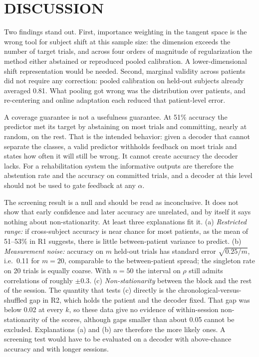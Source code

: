 \documentclass[letterpaper, 10pt, conference]{ieeeconf}
\begin{document}
\section{DISCUSSION}
Two findings stand out. First, importance weighting in
the tangent space is the wrong tool for subject shift at this sample size: the
dimension exceeds the number of target trials, and across four orders of
magnitude of regularization the method either abstained or reproduced pooled
calibration. A lower-dimensional shift representation would be needed. Second, marginal validity across patients did not require
any correction: pooled calibration on held-out subjects already averaged 0.81.
What pooling got wrong was the distribution over patients, and re-centering
\cite{zanini2018} and online adaptation each reduced that patient-level error.

A coverage guarantee is not a usefulness guarantee. At 51\% accuracy the
predictor met its target by abstaining on most trials and committing, nearly at
random, on the rest. That is the intended behavior: given a decoder that cannot
separate the classes, a valid predictor withholds feedback on most trials and
states how often it will still be wrong. It cannot create accuracy the decoder
lacks. For a rehabilitation system the informative outputs are
therefore the abstention rate and the accuracy on committed trials, and a
decoder at this level should not be used to gate feedback at any $\alpha$.

The screening result is a null and should be read as inconclusive. It does not
show that early confidence and later accuracy are unrelated, and by itself it
says nothing about non-stationarity. At least three explanations fit it. (a)
\emph{Restricted range:} if cross-subject accuracy is near chance for most
patients, as the mean of 51--53\% in R1 suggests, there is little between-patient
variance to predict. (b) \emph{Measurement noise:} accuracy on $m$ held-out
trials has standard error $\sqrt{0.25/m}$, i.e.\ 0.11 for $m=20$, comparable to
the between-patient spread; the singleton rate on 20 trials is equally coarse.
With $n=50$ the interval on $\rho$ still admits correlations of roughly
$\pm 0.3$. (c) \emph{Non-stationarity} between the block and the rest of the
session. The quantity that tests (c) directly is the chronological-versus-shuffled
gap in R2, which holds the patient and the decoder fixed. That gap was below
0.02 at every $k$, so these data give no evidence of within-session
non-stationarity of the scores, although gaps smaller than about 0.05 cannot be
excluded. Explanations (a) and (b) are therefore the more likely ones. A
screening test would have to be evaluated on a decoder with above-chance
accuracy and with longer sessions.
\end{document}
